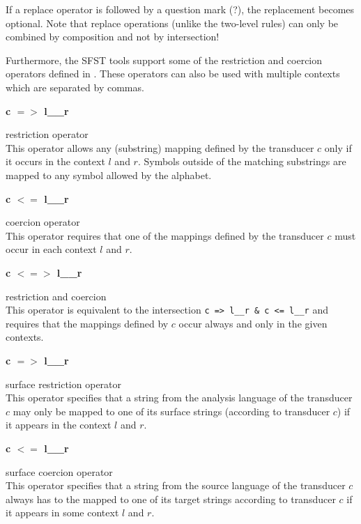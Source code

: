 \documentclass{article}
\begin{document}
If a replace operator is followed by a question mark (?), the
replacement becomes optional. Note that replace operations (unlike the
two-level rules) can only be combined by composition and not by
intersection!

Furthermore, the SFST tools support some of the restriction and
coercion operators defined in \cite{Yli-Jyrae:04}. These operators can
also be used with multiple contexts which are separated by commas.

\parbox[t]{2.7cm}{\textbf{c $=>$ l\_\_r}}
\begin{minipage}[t]{11.3cm}
  restriction operator\\
  This operator allows any (substring) mapping defined by the
  transducer $c$ only if it occurs in the context $l$ and $r$. Symbols
  outside of the matching substrings are mapped to any symbol allowed
  by the alphabet.
\end{minipage}
  
\parbox[t]{2.7cm}{\textbf{c $<=$ l\_\_r}}
\begin{minipage}[t]{11.3cm}
  coercion operator\\
  This operator requires that one of the mappings defined by the
  transducer $c$ must occur in each context $l$ and $r$.
\end{minipage}
  
\parbox[t]{2.7cm}{\textbf{c $<=>$ l\_\_r}}
\begin{minipage}[t]{11.3cm}
  restriction and coercion\\
  This operator is equivalent to the intersection
  \verb#c => l__r & c <= l__r# and requires that
  the mappings defined by $c$ occur always and only in the given
  contexts.
\end{minipage}
  

\parbox[t]{2.7cm}{\textbf{c $=>$ l\_\_r}}
\begin{minipage}[t]{11.3cm}
  surface restriction operator\\
  This operator specifies that a string from the analysis language of
  the transducer $c$ may only be mapped to one of its surface strings
  (according to transducer $c$) if it appears in the context $l$ and
  $r$.
\end{minipage}
  
\parbox[t]{2.7cm}{\textbf{c $<=$ l\_\_r}}
\begin{minipage}[t]{11.3cm}
  surface coercion operator\\
  This operator specifies that a string from the source language of
  the transducer $c$ always has to the mapped to one of its target
  strings according to transducer $c$ if it appears in some context
  $l$ and $r$.
\end{minipage}
  
\end{document}
